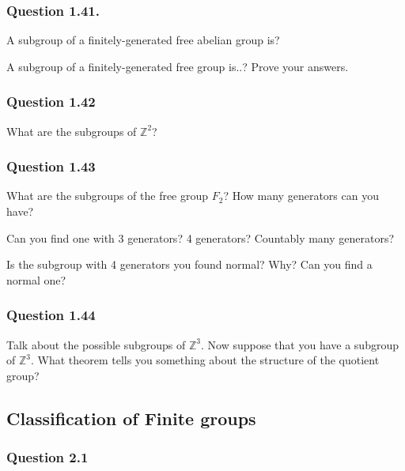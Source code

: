 \hypertarget{question-1.41.}{%
\subsubsection{Question 1.41.}\label{question-1.41.}}

A subgroup of a finitely-generated free abelian group is?

A subgroup of a finitely-generated free group is..? Prove your answers.

\hypertarget{question-1.42}{%
\subsubsection{Question 1.42}\label{question-1.42}}

What are the subgroups of \({\mathbb{Z}}^2\)?

\hypertarget{question-1.43}{%
\subsubsection{Question 1.43}\label{question-1.43}}

What are the subgroups of the free group \(F_2\)? How many generators
can you have?

Can you find one with 3 generators? 4 generators? Countably many
generators?

Is the subgroup with 4 generators you found normal? Why? Can you find a
normal one?

\hypertarget{question-1.44}{%
\subsubsection{Question 1.44}\label{question-1.44}}

Talk about the possible subgroups of \({\mathbb{Z}}^3\). Now suppose
that you have a subgroup of \({\mathbb{Z}}^3\). What theorem tells you
something about the structure of the quotient group?

\hypertarget{classification-of-finite-groups}{%
\subsection{Classification of Finite
groups}\label{classification-of-finite-groups}}

\hypertarget{question-2.1}{%
\subsubsection{Question 2.1}\label{question-2.1}}

